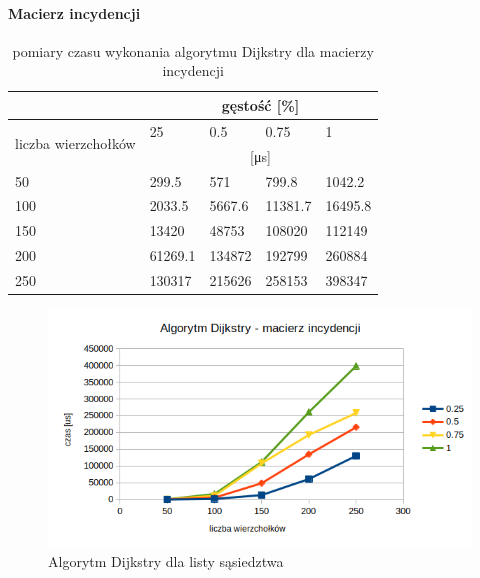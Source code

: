 \documentclass[11pt]{article}
\begin{document}
\paragraph{Macierz incydencji}

\begin{table}[H]
    \centering
    \begin{tabular}{|l|llll|}
        \hline
                                             & \multicolumn{4}{c|}{gęstość {[}\%{]}}                                                                        \\ \hline
        \multirow{2}{*}{liczba wierzchołków} & \multicolumn{1}{l|}{25}               & \multicolumn{1}{l|}{0.5}    & \multicolumn{1}{l|}{0.75}    & 1       \\ \cline{2-5}
                                             & \multicolumn{4}{c|}{[μs]}                                                                                    \\ \hline
        50                                   & \multicolumn{1}{l|}{299.5}            & \multicolumn{1}{l|}{571}    & \multicolumn{1}{l|}{799.8}   & 1042.2  \\ \hline
        100                                  & \multicolumn{1}{l|}{2033.5}           & \multicolumn{1}{l|}{5667.6} & \multicolumn{1}{l|}{11381.7} & 16495.8 \\ \hline
        150                                  & \multicolumn{1}{l|}{13420}            & \multicolumn{1}{l|}{48753}  & \multicolumn{1}{l|}{108020}  & 112149  \\ \hline
        200                                  & \multicolumn{1}{l|}{61269.1}          & \multicolumn{1}{l|}{134872} & \multicolumn{1}{l|}{192799}  & 260884  \\ \hline
        250                                  & \multicolumn{1}{l|}{130317}           & \multicolumn{1}{l|}{215626} & \multicolumn{1}{l|}{258153}  & 398347  \\ \hline
    \end{tabular}
    \caption{pomiary czasu wykonania algorytmu Dijkstry dla macierzy incydencji}
\end{table}

\begin{figure}[H]
    \includegraphics[width=13cm]{images/dijkstramacierz.png}
    \caption{ Algorytm Dijkstry dla listy sąsiedztwa}
\end{figure}
\end{document}
